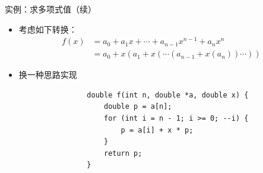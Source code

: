 \begin{fragile}
    \frametitle{\insertsubsectionhead}
    \begin{exampleblock}{实例：求多项式值（续）}
        \begin{itemize}
            \item 考虑如下转换：
                  \begin{align*}
                      f(x) & = a_{0} + a_{1}x + \cdots + a_{n-1}x^{n-1} + a_{n}x^{n}  \\
                           & = a_{0} + x(a_{1} + x(\cdots(a_{n-1} + x(a_{n}))\cdots))
                  \end{align*}
            \item<2-> 换一种思路实现
                \begin{verbatim}
                double f(int n, double *a, double x) {
                    double p = a[n];
                    for (int i = n - 1; i >= 0; --i) {
                        p = a[i] + x * p;
                    }
                    return p;
                }
            \end{verbatim}
        \end{itemize}
    \end{exampleblock}
\end{fragile}

